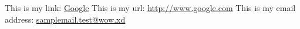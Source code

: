 \documentclass{article}
\begin{document}
This is my link: \href{http://www.google.com}{Google} %
\newline
This is my url: \url{http://www.google.com} %
\newline
This is my email address: \href{mailto:samplemail.test@wow.xd}{samplemail.test@wow.xd} %
\end{document}
